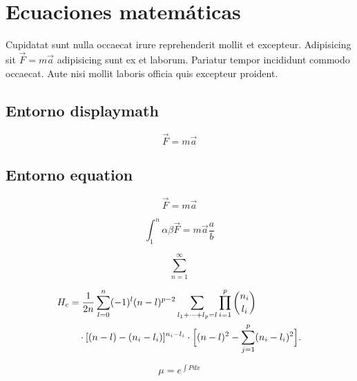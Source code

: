 \documentclass{article}
\begin{document}
\section{Ecuaciones matemáticas}
Cupidatat sunt nulla occaecat irure reprehenderit mollit et excepteur. Adipisicing sit $\vec{F} = m \vec{a}$ adipisicing sunt ex et laborum. Pariatur tempor incididunt commodo occaecat. Aute nisi mollit laboris officia quis excepteur proident. %


\subsection{Entorno displaymath}


\begin{displaymath}
  \vec{F} = m \vec{a}
\end{displaymath}

\subsection{Entorno equation}

\begin{equation}
  \vec{F} = m \vec{a}
\end{equation}

\begin{equation}
  \int_1^n \alpha \beta \vec{F} = m \vec{a} \frac{a}{b}
\end{equation}


\begin{equation}
\sum_{n = 1}^{\infty}
\end{equation}

\begin{equation}
  \begin{split}
    H_c&=\frac{1}{2n} \sum^n_{l=0}(-1)^{l}(n-{l})^{p-2}
    \sum_{l _1+\dots+ l _p=l}\prod^p_{i=1} \binom{n_i}{l _i}\\
    &\quad\cdot[(n-l )-(n_i-l _i)]^{n_i-l _i}\cdot
    \Bigl[(n-l )^2-\sum^p_{j=1}(n_i-l _i)^2\Bigr].
  \end{split}
\end{equation}

\begin{equation}
  \mu=e^{\int P dx}
  \end{equation}

\end{document}

